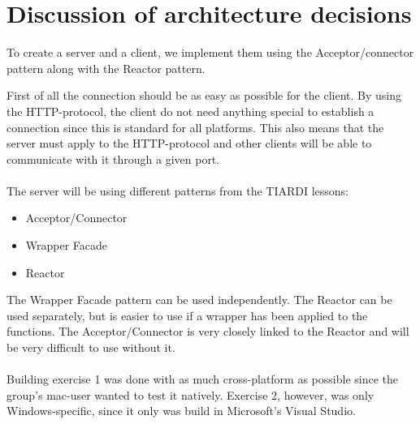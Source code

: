 \documentclass[Main]{subfiles}
\begin{document}
\section{Discussion of architecture decisions}

To create a server and a client, we implement them using the Acceptor/connector pattern along with the Reactor pattern.


First of all the connection should be as easy as possible for the client. 
By using the HTTP-protocol, the client do not need anything special to establish a connection since this is standard for all platforms.
This also means that the server must apply to the HTTP-protocol and other clients will be able to communicate with it through a given port.
\\
\\
The server will be using different patterns from the TIARDI lessons:
\begin{itemize}
	\item Acceptor/Connector
	\item Wrapper Facade
	\item Reactor
\end{itemize}
The Wrapper Facade pattern can be used independently.
The Reactor can be used separately, but is easier to use if a wrapper has been applied to the functions. 
The Acceptor/Connector is very closely linked to the Reactor and will be very difficult to use without it.
\\
\\
Building exercise 1 was done with as much cross-platform as possible since the group's mac-user wanted to test it natively. 
Exercise 2, however, was only Windows-specific, since it only was build in Microsoft's Visual Studio.	
\end{document}
